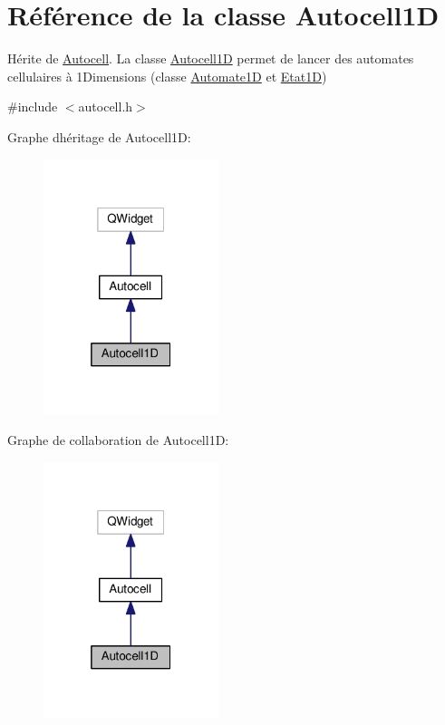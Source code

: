 \hypertarget{class_autocell1_d}{}\section{Référence de la classe Autocell1D}
\label{class_autocell1_d}


Hérite de \hyperlink{class_autocell}{Autocell}. La classe \hyperlink{class_autocell1_d}{Autocell1D} permet de lancer des automates cellulaires à 1\+Dimensions (classe \hyperlink{class_automate1_d}{Automate1D} et \hyperlink{class_etat1_d}{Etat1D})  




{\ttfamily \#include $<$autocell.\+h$>$}



Graphe d\textquotesingle{}héritage de Autocell1D\+:\nopagebreak
\begin{figure}[H]
\begin{center}
\leavevmode
\includegraphics[width=145pt]{class_autocell1_d__inherit__graph}
\end{center}
\end{figure}


Graphe de collaboration de Autocell1D\+:\nopagebreak
\begin{figure}[H]
\begin{center}
\leavevmode
\includegraphics[width=145pt]{class_autocell1_d__coll__graph}
\end{center}
\end{figure}
